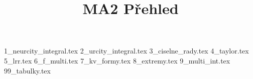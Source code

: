 \documentclass[a4paper]{article}
\begin{document}
\title{MA2 Přehled}

\maketitle
\pagebreak

{1_neurcity_integral.tex}
{2_urcity_integral.tex}
{3_ciselne_rady.tex}
{4_taylor.tex}
{5_lrr.tex}
{6_f_multi.tex}
{7_kv_formy.tex}
{8_extremy.tex}
{9_multi_int.tex}
{99_tabulky.tex}
\end{document}
